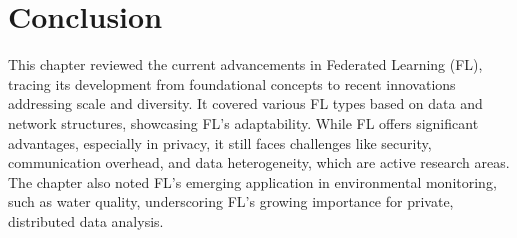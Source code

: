 \newpage

\section*{Conclusion}


This chapter reviewed the current advancements in Federated Learning (FL), tracing its development from foundational concepts to recent innovations addressing scale and diversity. It covered various FL types based on data and network structures, showcasing FL's adaptability. While FL offers significant advantages, especially in privacy, it still faces challenges like security, communication overhead, and data heterogeneity, which are active research areas. The chapter also noted FL's emerging application in environmental monitoring, such as water quality, underscoring FL's growing importance for private, distributed data analysis.


























